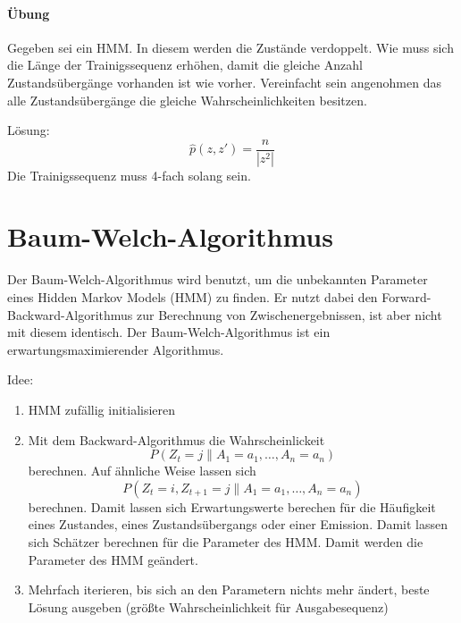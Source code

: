 \begin{shaded}
\paragraph{Übung}
\label{par:ubung2}

Gegeben sei ein HMM.
In diesem werden die Zustände verdoppelt.
Wie muss sich die Länge der Trainigssequenz erhöhen, damit die gleiche Anzahl Zustandsübergänge vorhanden ist wie vorher.
Vereinfacht sein angenohmen das alle Zustandsübergänge die gleiche Wahrscheinlichkeiten besitzen.

Lösung:
\[\hat p(z,z') = \frac{n}{|z^2|}\]
Die Trainigssequenz muss 4-fach solang sein.
\end{shaded}

\section{Baum-Welch-Algorithmus}
Der Baum-Welch-Algorithmus wird benutzt, um die unbekannten Parameter eines Hidden Markov Models (HMM) zu finden.
Er nutzt dabei den Forward-Backward-Algorithmus zur Berechnung von Zwischenergebnissen, ist aber nicht mit diesem identisch.
Der Baum-Welch-Algorithmus ist ein erwartungsmaximierender Algorithmus.

Idee:
\begin{enumerate}
	\item HMM zufällig initialisieren
	\item Mit dem Backward-Algorithmus die Wahrscheinlickeit \[P(Z_{t} = j \| A_{1} = a_{1}, \ldots, A_{n} = a_{n})\]berechnen.
			Auf ähnliche Weise lassen sich \[P(Z_{t} = i, Z_{t+1} = j \| A_{1} = a_{1}, \ldots, A_{n} = a_{n})\] berechnen.
			Damit lassen sich Erwartungswerte berechen für die Häufigkeit eines Zustandes, eines Zustandsübergangs oder einer Emission.
			Damit lassen sich Schätzer berechnen für die Parameter des HMM.
			Damit werden die Parameter des HMM geändert.
	\item Mehrfach iterieren, bis sich an den Parametern nichts mehr ändert, beste Lösung ausgeben (größte Wahrscheinlichkeit für Ausgabesequenz)
\end{enumerate}

